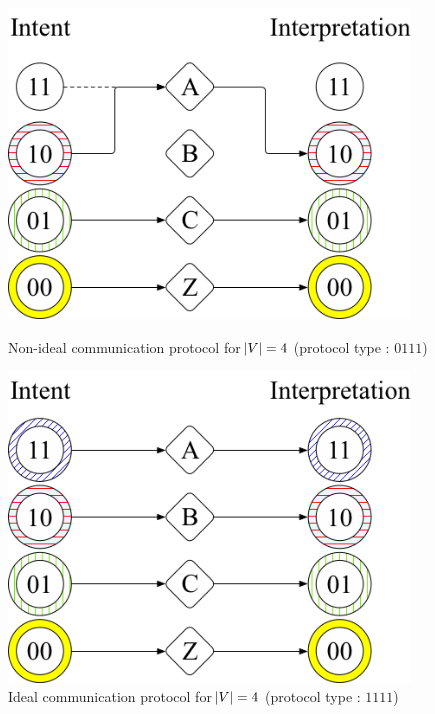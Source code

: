 \begin{figure}[H]
\centering
\begin{minipage}[t]{.5\textwidth}
    \centering
    \includegraphics[width=0.95\textwidth]{imgs/protocol-4msg-low.png}
    \caption[Non-ideal communication protocol for $\abs{V} = 4$]{Non-ideal communication protocol for $\abs{V} = 4$ (protocol type : $0111$)}
    \label{fig:protocol-4msg-bad}
\end{minipage}%
\begin{minipage}[t]{.50\textwidth}
    \centering
    \includegraphics[width=0.95\textwidth]{imgs/protocol-4msg-high.png}
    \caption[Ideal communication protocol for $\abs{V} = 4$]{Ideal communication protocol for $\abs{V} = 4$ (protocol type : $1111$)}
    \label{fig:protocol-4msg-good}
\end{minipage}
\end{figure}

